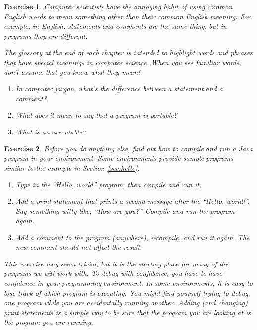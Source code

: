 \documentclass[12pt]{book}
\theoremstyle{exercise}
\newtheorem{exercise}{Exercise}[chapter]
\begin{document}
\begin{exercise}

Computer scientists have the annoying habit of using common English words to mean something other than their common English meaning.
For example, in English, statements and comments are the same thing, but in programs they are different.

The glossary at the end of each chapter is intended to highlight words and phrases that have special meanings in computer science.
When you see familiar words, don't assume that you know what they mean!

\begin{enumerate}
\item In computer jargon, what's the difference between a statement and a comment?
\item What does it mean to say that a program is portable?
\item What is an executable?
\end{enumerate}

\end{exercise}


\begin{exercise}

Before you do anything else, find out how to compile and run a Java program in your environment.
Some environments provide sample programs similar to the example in Section~\ref{sec:hello}.

\begin{enumerate}
\item Type in the ``Hello, world'' program, then compile and run it.

\item Add a print statement that prints a second message after the ``Hello, world!''.
Say something witty like, ``How are you?''
Compile and run the program again.

\item Add a comment to the program (anywhere), recompile, and run it again.
The new comment should not affect the result.
\end{enumerate}

This exercise may seem trivial, but it is the starting place for many of the programs we will work with.
To debug with confidence, you have to have confidence in your programming environment.
In some environments, it is easy to lose track of which program is executing.
You might find yourself trying to debug one program while you are accidentally running another.
Adding (and changing) print statements is a simple way to be sure that the program you are looking at is the program you are running.

\end{exercise}
\end{document}
